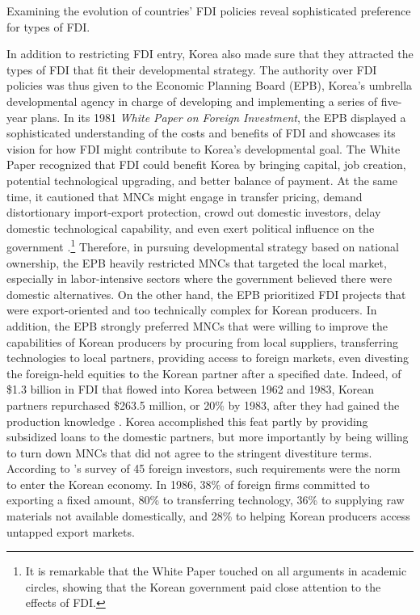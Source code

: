 Examining the evolution of countries' FDI policies reveal sophisticated
preference for types of FDI.

In addition to restricting FDI entry, Korea also made sure that they attracted
the types of FDI that fit their developmental strategy. The authority over FDI
policies was thus given to the Economic Planning Board (EPB), Korea's umbrella
developmental agency in charge of developing and implementing a series of
five-year plans. In its 1981 \textit{White Paper on Foreign Investment}, the EPB
displayed a sophisticated understanding of the costs and benefits of FDI and
showcases its vision for how FDI might contribute to Korea's developmental goal.
The White Paper recognized that FDI could benefit Korea by bringing capital, job
creation, potential technological upgrading, and better balance of payment. At
the same time, it cautioned that MNCs might engage in transfer pricing, demand
distortionary import-export protection, crowd out domestic investors, delay
domestic technological capability, and even exert political influence on the
government \citep[50-64, quoted in \citet{Chang2004}]{EPB1981}.\footnote{It is
  remarkable that the White Paper touched on all arguments in academic circles,
  showing that the Korean government paid close attention to the effects of
  FDI.} Therefore, in pursuing developmental strategy based on national
ownership, the EPB heavily restricted MNCs that targeted the local market,
especially in labor-intensive sectors where the government believed there were
domestic alternatives. On the other hand, the EPB prioritized FDI projects that
were export-oriented and too technically complex for Korean producers. In
addition, the EPB strongly preferred MNCs that were willing to improve the
capabilities of Korean producers by procuring from local suppliers, transferring
technologies to local partners, providing access to foreign markets, even
divesting the foreign-held equities to the Korean partner after a specified
date. Indeed, of \$1.3 billion in FDI that flowed into Korea between 1962 and
1983, Korean partners repurchased \$263.5 million, or 20\% by 1983, after they
had gained the production knowledge \citep[135]{Mardon1990}. Korea accomplished
this feat partly by providing subsidized loans to the domestic partners, but
more importantly by being willing to turn down MNCs that did not agree to the
stringent divestiture terms. According to \citet{Mardon1990}'s survey of 45
foreign investors, such requirements were the norm to enter the Korean economy.
In 1986, 38\% of foreign firms committed to exporting a fixed amount, 80\% to
transferring technology, 36\% to supplying raw materials not available
domestically, and 28\% to helping Korean producers access untapped export
markets.

